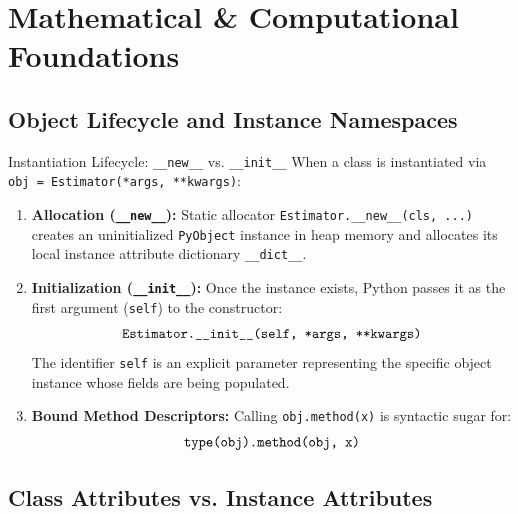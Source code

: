 \section{Mathematical \& Computational Foundations}

\subsection{Object Lifecycle and Instance Namespaces}

\begin{definitionbox}{Instantiation Lifecycle: \texttt{\_\_new\_\_} vs. \texttt{\_\_init\_\_}}
  
When a class is instantiated via \texttt{obj = Estimator(*args, **kwargs)}:
\begin{enumerate}
    \item \textbf{Allocation (\texttt{\_\_new\_\_}):} Static allocator \texttt{Estimator.\_\_new\_\_(cls, ...)} creates an uninitialized \texttt{PyObject} instance in heap memory and allocates its local instance attribute dictionary \texttt{\_\_dict\_\_}.
    \item \textbf{Initialization (\texttt{\_\_init\_\_}):} Once the instance exists, Python passes it as the first argument (\texttt{self}) to the constructor:
    \begin{equation}
    \text{\texttt{Estimator.\_\_init\_\_(self, *args, **kwargs)}}
    \end{equation}
    The identifier \texttt{self} is an explicit parameter representing the specific object instance whose fields are being populated.
    \item \textbf{Bound Method Descriptors:} Calling \texttt{obj.method(x)} is syntactic sugar for:
    \begin{equation}
    \text{\texttt{type(obj).method(obj, x)}}
    \end{equation}
\end{enumerate}
\end{definitionbox}

\subsection{Class Attributes vs. Instance Attributes}

